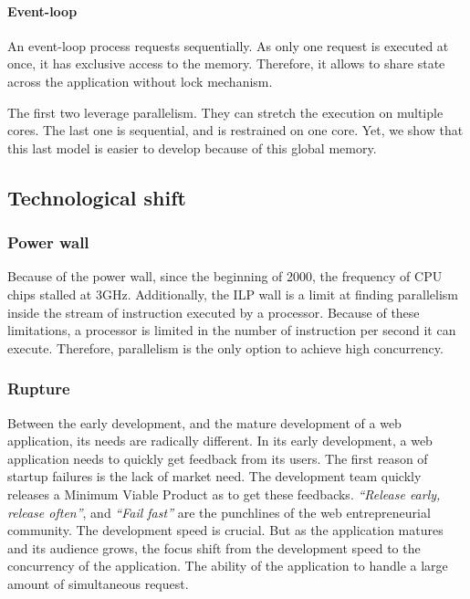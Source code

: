 \paragraph{Event-loop}

An event-loop process requests sequentially.
As only one request is executed at once, it has exclusive access to the memory.
Therefore, it allows to share state across the application without lock mechanism.


The first two leverage parallelism.
They can stretch the execution on multiple cores.
The last one is sequential, and is restrained on one core.
Yet, we show that this last model is easier to develop because of this global memory.

\subsection{Technological shift}

\subsubsection{Power wall}

Because of the power wall, since the beginning of 2000, the frequency of CPU chips stalled at 3GHz.
Additionally, the ILP wall is a limit at finding parallelism inside the stream of instruction executed by a processor.
Because of these limitations, a processor is limited in the number of instruction per second it can execute.
Therefore, parallelism is the only option to achieve high concurrency.

\subsubsection{Rupture}

Between the early development, and the mature development of a web application, its needs are radically different.
In its early development, a web application needs to quickly get feedback from its users.
The first reason of startup failures is the lack of market need.
The development team quickly releases a Minimum Viable Product as to get these feedbacks.
\textit{``Release early, release often''}, and \textit{``Fail fast''} are the punchlines of the web entrepreneurial community.
The development speed is crucial.
But as the application matures and its audience grows, the focus shift from the development speed to the concurrency of the application.
The ability of the application to handle a large amount of simultaneous request.

